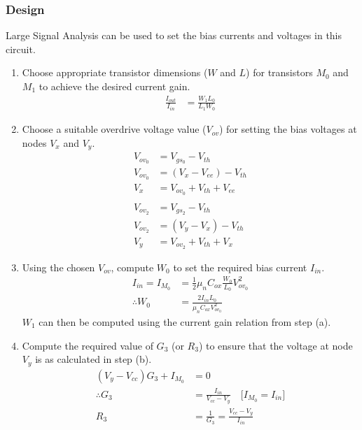 \subsubsection{Design}
Large Signal Analysis can be used to set the bias
currents and voltages in this circuit.
\begin{enumerate}
  \item Choose appropriate transistor dimensions
    ($W$ and $L$) for transistors $M_0$ and $M_1$
    to achieve the desired current gain.
    \begin{align*}
      \frac{I_{out}}{I_{in}} &= \frac{W_1 L_0}{L_1 W_0}
    \end{align*}
  \item Choose a suitable overdrive voltage value
    ($V_{ov}$) for setting the bias voltages at
    nodes $V_{x}$ and $V_{y}$.
    \begin{align*}
      V_{ov_0} &= V_{gs_0} - V_{th} \\
      V_{ov_0} &= (V_{x} - V_{ee}) - V_{th} \\
      V_{x} &= V_{ov_0} + V_{th} + V_{ee} \\
      \\
      V_{ov_2} &= V_{gs_2} - V_{th} \\
      V_{ov_2} &= (V_{y} - V_{x}) - V_{th} \\
      V_{y} &= V_{ov_2} + V_{th} + V_{x}
    \end{align*}
  \item Using the chosen $V_{ov}$, compute $W_0$
    to set the required bias current $I_{in}$.
    \begin{align*}
      I_{in} = I_{M_0} &= \frac{1}{2} \mu_n C_{ox} \frac{W_0}{L_0} V_{ov_0}^2 \\
      \therefore W_0 &= \frac{2 I_{in} L_0}{\mu_n C_{ox} V_{ov_0}^2}
    \end{align*}
    $W_1$ can then be computed using the current
    gain relation from step (a).
  \item Compute the required value of $G_3$ (or
    $R_3$) to ensure that the voltage at node
    $V_{y}$ is as calculated in step (b).
    \begin{align*}
      (V_{y} - V_{cc})G_3 + I_{M_0} &= 0 \\
      \therefore G_3 &= \frac{I_{in}}{V_{cc} - V_{y}} \quad \text{[}I_{M_0} = I_{in} \text{]} \\
      R_3 &= \frac{1}{G_3} = \frac{V_{cc} - V_{y}}{I_{in}}
    \end{align*}
\end{enumerate}

